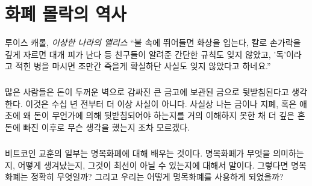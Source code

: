 \chapter{화폐 몰락의 역사}
\label{les:12}

\begin{chapquote}{루이스 캐롤, \textit{이상한 나라의 앨리스}}
	\enquote{불 속에 뛰어들면 화상을 입는다, 칼로 손가락을 깊게 자르면 대개 피가 난다 등
		친구들이 알려준 간단한 규칙도 잊지 않았고, '독'이라고 적힌 병을 마시면
		조만간 죽을게 확실하단 사실도 잊지 않았다고 하네요.}
\end{chapquote}

\begin{comment}
	Many people think that money is backed by gold, which is locked away in
	big vaults, protected by thick
	walls. This ceased to be true many decades ago. I am not sure what I
	thought, since I was in much deeper trouble, having virtually no
	understanding of gold, paper money, or why it would need to be backed by
	something in the first place.
\end{comment}

\paragraph{}
많은 사람들은 돈이 두꺼운 벽으로 감싸진 큰 금고에 보관된 금으로 뒷받침된다고 생각한다. 
이것은 수십 년 전부터 더 이상 사실이 아니다.
사실상 나는 금이나 지폐, 혹은 애초에 왜 돈이 무언가에 의해 뒷받침되어야 하는지를 거의 이해하지 못한 채 더 깊은 혼돈에 빠진 이후로 무슨 생각을 했는지 조차 모르겠다.

\begin{comment}
	One part of learning about Bitcoin is learning about fiat money: what it
	means, how it came to be, and why it might not be the best idea we ever
	had. So, what exactly is fiat money? And how did we end up using it?
\end{comment}

\paragraph{}
비트코인 교훈의 일부는 명목화폐에 대해 배우는 것이다. 
명목화폐가 무엇을 의미하는지, 어떻게 생겨났는지, 
그것이 최선이 아닐 수 있는지에 대해서 말이다. 
그렇다면 명목화폐는 정확히 무엇일까? 
그리고 우리는 어떻게 명목화폐를 사용하게 되었을까?

\begin{comment}
	If something is imposed by \textit{fiat}, it simply means that it is imposed by
	formal authorization or proposition. Thus, fiat money is money simply
	because \textit{someone} says that it is money. Since all governments use fiat
	currency today, this someone is \textit{your} government. Unfortunately, you
	are not \textit{free} to disagree with this value proposition. You will quickly
	feel that this proposition is everything but non-violent. If you refuse
	to use this paper currency to do business and pay taxes the only people
	you will be able to discuss economics with will be your cellmates.
\end{comment}

